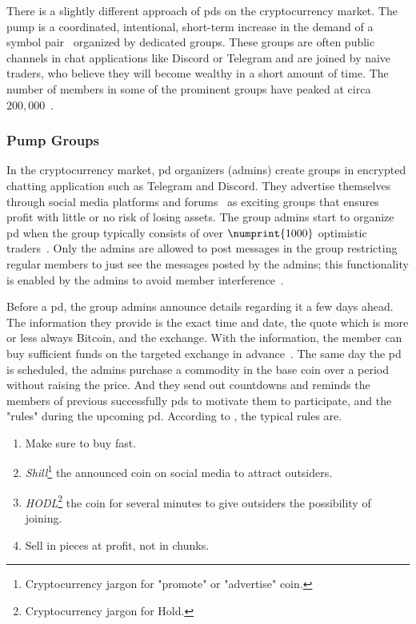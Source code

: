 There is a slightly different approach of \acp{pd} on the cryptocurrency market. The pump is a coordinated, intentional, short-term increase in the demand of a symbol pair~\cite{P&D_anatomy} organized by dedicated groups. These groups are often public channels in chat applications like Discord or Telegram and are joined by naive traders, who believe they will become wealthy in a short amount of time. The number of members in some of the prominent groups have peaked at circa $200,000$~\cite{P&D_the_outline}.

\subsubsection{Pump Groups}\label{sec:pump_groups}
In the cryptocurrency market, \ac{pd} organizers (admins) create groups in encrypted chatting application such as Telegram and Discord. They advertise themselves through social media platforms and forums~\cite{P&D_anatomy, P&D_scheme} as exciting groups that ensures profit with little or no risk of losing assets. The group admins start to organize \ac{pd} when the group typically consists of over $\numprint{1000}$ optimistic traders~\cite{P&D_anatomy}. Only the admins are allowed to post messages in the group restricting regular members to just see the messages posted by the admins; this functionality is enabled by the admins to avoid member interference~\cite{P&D_anatomy}.

Before a \ac{pd}, the group admins announce details regarding it a few days ahead. The information they provide is the exact time and date, the quote which is more or less always Bitcoin, and the exchange. With the information, the member can buy sufficient funds on the targeted exchange in advance~\cite{P&D_anatomy}. The same day the \ac{pd} is scheduled, the admins purchase a commodity in the base coin over a period without raising the price. And they send out countdowns and reminds the members of previous successfully \acp{pd} to motivate them to participate, and the "rules" during the upcoming \ac{pd}. According to \cite{P&D_anatomy}, the typical rules are.

\begin{enumerate}
    \item Make sure to buy fast.
    \item \emph{Shill}\footnote{Cryptocurrency jargon for "promote" or "advertise" coin.} the announced coin on social media to attract outsiders.
    \item \emph{HODL}\footnote{Cryptocurrency jargon for Hold.} the coin for several minutes to give outsiders the possibility of joining.
    \item Sell in pieces at profit, not in chunks.
\end{enumerate}

